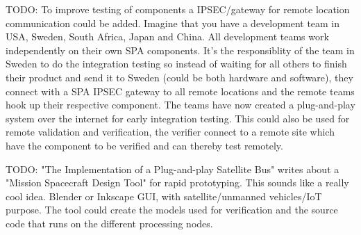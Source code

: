 TODO: To improve testing of components a IPSEC/gateway for remote location
communication could be added. Imagine that you have a development team in USA,
Sweden, South Africa, Japan and China. All development teams work independently
on their own SPA components. It's the responsiblity of the team in Sweden to do
the integration testing so instead of waiting for all others to finish their
product and send it to Sweden (could be both hardware and software), they
connect with a SPA IPSEC gateway to all remote locations and the remote teams
hook up their respective component. The teams have now created a plug-and-play
system over the internet for early integration testing. This could also be used
for remote validation and verification, the verifier connect to a remote site
which have the component to be verified and can thereby test remotely.

TODO: "The Implementation of a Plug-and-play Satellite Bus" writes about a
"Mission Spacecraft Design Tool" for rapid prototyping. This sounds like a
really cool idea. Blender or Inkscape GUI, with satellite/unmanned vehicles/IoT
purpose. The tool could create the models used for verification and the source
code that runs on the different processing nodes.

